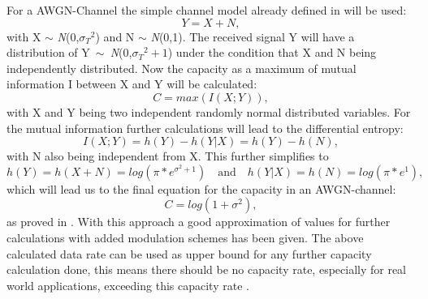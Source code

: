 For a \gls{AWGN}-Channel the simple channel model already defined in  will be used:
\begin{equation}
\label{eq:chanAWGN}
Y = X + N,   
\end{equation}
with X $\sim$ \textit{N}(0,${\sigma_{T}}^2$) and N $\sim$ \textit{N}(0,1). The received signal Y will have a distribution of \mbox{Y $\sim$ \textit{N}(0,${\sigma_{T}}^2+1$)} under the condition that X and N being independently distributed.
Now the capacity as a maximum of mutual information I between X and Y will be calculated:
\begin{equation}
\label{eq:cap}
C = max(I(X;Y)),     
\end{equation}
with X and Y being two independent randomly normal distributed variables.
\newline
For the mutual information further calculations will lead to the differential entropy:
\begin{equation}
I(X;Y) = h(Y) - h(Y|X)
= h(Y) - h(N),
\end{equation}
with N also being independent from X.
\newline
This further simplifies to 
\begin{equation}
h(Y) = h(X+N) = log(\pi*e^{\sigma^2+1}) \quad \textrm{and} \quad h(Y|X) = h(N) = log(\pi*e^{1}),
\end{equation}
which will lead us to the final equation for the capacity in an AWGN-channel:
\begin{equation}
\label{eq:AWGNcap}
C = log(1+\sigma^2),
\end{equation}
as proved in \cite{Kramer}.
\newline
With this approach a good approximation of values for further calculations with added modulation schemes has been given. The above calculated data rate can be used as upper bound for any further capacity calculation done, this means there should be no capacity rate, especially for real world applications, exceeding this capacity rate \cite{Shannon}.


